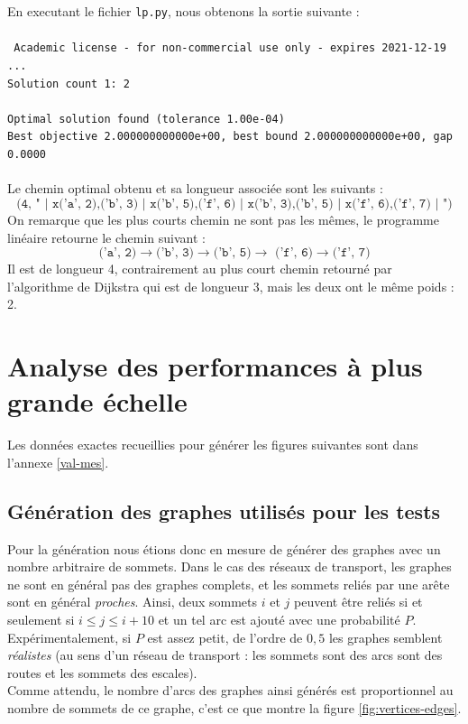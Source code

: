 \documentclass{article}
\begin{document}
En executant le fichier \texttt{lp.py}, nous obtenons la sortie suivante :
\\ \\
\texttt{
    Academic license - for non-commercial use only - expires 2021-12-19 \\
    ... \\
    Solution count 1: 2\\
    \\
    Optimal solution found (tolerance 1.00e-04)\\
    Best objective 2.000000000000e+00, best bound 2.000000000000e+00, gap 0.0000\\
}\\
Le chemin optimal obtenu et sa longueur associée sont les suivants :
$$
\texttt{
    (4, " | x('a', 2),('b', 3) | x('b', 5),('f', 6) | x('b', 3),('b', 5) | x('f', 6),('f', 7) | ")
}$$
On remarque que les plus courts chemin ne sont pas les mêmes, le programme
linéaire retourne le chemin suivant :
\begin{equation}
    \texttt{('a', 2)}\rightarrow \texttt{('b', 3)} \rightarrow \texttt{('b', 5)}
    \rightarrow \texttt{ ('f', 6)} \rightarrow \texttt{('f', 7)}
\end{equation}
Il est de longueur 4, contrairement au plus court chemin retourné par
l'algorithme de Dijkstra qui est de longueur 3, mais les deux ont le même poids : 2.

\section{Analyse des performances à plus grande échelle}
Les données exactes recueillies pour générer les figures suivantes sont dans
l'annexe \ref{val-mes}.

\subsection{Génération des graphes utilisés pour les tests}
Pour la génération nous étions donc en mesure de générer des graphes avec un
nombre arbitraire de sommets. Dans le cas des réseaux de transport, les graphes
ne sont en général pas des graphes complets, et les sommets reliés par une arête
sont en général \textit{proches}. Ainsi, deux sommets $i$ et $j$ peuvent être
reliés si et seulement si $i \leq j \leq i+10$ et un tel arc est ajouté avec une
probabilité $P$. Expérimentalement, si $P$ est assez petit, de l'ordre de $0,5$
les graphes semblent \textit{réalistes} (au sens d'un réseau de transport : les
sommets sont des arcs sont des routes et les sommets des escales). \\
Comme attendu, le nombre d'arcs des graphes ainsi générés est proportionnel au
nombre de sommets de ce graphe, c'est ce que montre la figure
\ref{fig:vertices-edges}.
\end{document}
